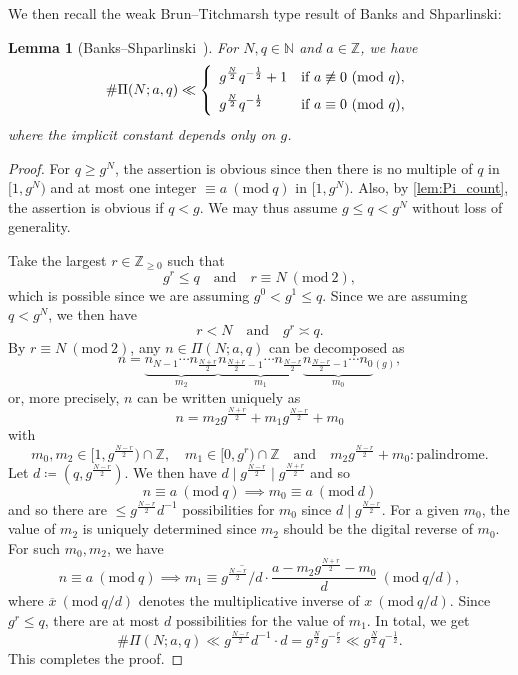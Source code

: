 \documentclass{amsart}
\theoremstyle{plain}
\newtheorem{lemma}[theorem]{Lemma}
\theoremstyle{definition}
\renewcommand{\mod}[1]{(\mathrm{mod}\ #1)}
\renewcommand{\and}{\quad\text{and}\quad}
\begin{document}
We then recall the weak Brun--Titchmarsh type result of Banks and Shparlinski:
\begin{lemma}[Banks--Shparlinski~\cite{BanksShparlinski:PrimeDivisorPalindrome}]
\label{lem:BS_Brun_Titchmarsh}
For $N,q\in\mathbb{N}$ and $a\in\mathbb{Z}$, we have
\[
\#\Pi(N;a,q)
\ll
\left\{
\begin{array}{>{\displaystyle}ll}
g^{\frac{N}{2}}q^{-\frac{1}{2}}+1&\text{if $a\not\equiv0\ \mod{q}$},\\[2mm]
g^{\frac{N}{2}}q^{-\frac{1}{2}}&\text{if $a\equiv0\ \mod{q}$},
\end{array}
\right.
\]
where the implicit constant depends only on $g$.
\end{lemma}
\begin{proof}
For $q\ge g^{N}$, the assertion is obvious since then
there is no multiple of $q$ in $[1,g^{N})$
and at most one integer $\equiv a\ \mod{q}$ in $[1,g^{N})$.
Also, by \cref{lem:Pi_count},
the assertion is obvious if $q<g$.
We may thus assume $g\le q<g^{N}$ without loss of generality.

Take the largest $r\in\mathbb{Z}_{\ge0}$ such that
\[
g^{r}\le q
\and
r\equiv N\ \mod{2},
\]
which is possible since we are assuming $g^{0}<g^{1}\le q$.
Since we are assuming $q<g^{N}$, we then have
\[
r<N
\and
g^{r}\asymp q.
\]
By $r\equiv N\ \mod{2}$,
any $n\in\Pi(N;a,q)$ can be decomposed as
\[
n=
{\underbrace{n_{N-1}\cdots n_{\frac{N+r}{2}}}_{m_{2}}
\underbrace{n_{\frac{N+r}{2}-1}\cdots n_{\frac{N-r}{2}}}_{m_{1}}
\underbrace{n_{\frac{N-r}{2}-1}\cdots n_{0}}_{m_{0}}}{}_{(g)},
\]
or, more precisely, $n$ can be written uniquely as
\[
n
=
m_{2}g^{\frac{N+r}{2}}
+m_{1}g^{\frac{N-r}{2}}
+m_{0}
\]
with
\[
m_{0},m_{2}\in[1,g^{\frac{N-r}{2}})\cap\mathbb{Z},\quad
m_{1}\in[0,g^{r})\cap\mathbb{Z}
\and
m_{2}g^{\frac{N-r}{2}}+m_{0}:\text{palindrome}.
\]
Let $d\coloneqq(q,g^{\frac{N-r}{2}})$. We then have $d\mid g^{\frac{N-r}{2}}\mid g^{\frac{N+r}{2}}$ and so
\[
n\equiv a\ \mod{q}
\implies
m_{0}\equiv a\ \mod{d}
\]
and so there are $\le g^{\frac{N-r}{2}}d^{-1}$ possibilities for $m_{0}$
since $d\mid g^{\frac{N-r}{2}}$.
For a given $m_{0}$,
the value of $m_{2}$ is uniquely determined
since $m_{2}$ should be the digital reverse of $m_{0}$.
For such $m_{0},m_{2}$, we have
\[
n\equiv a\ \mod{q}
\implies
m_{1}
\equiv
\overline{g^{\frac{N-r}{2}}/d}\cdot\frac{a-m_{2}g^{\frac{N+r}{2}}-m_{0}}{d}\ \mod{q/d},
\]
where $\overline{x}\ \mod{q/d}$ denotes the multiplicative inverse of $x\ \mod{q/d}$.
Since $g^{r}\le q$, there are at most $d$ possibilities for the value of $m_{1}$.
In total, we get
\[
\#\Pi(N;a,q)
\ll
g^{\frac{N-r}{2}}d^{-1}\cdot d
=
g^{\frac{N}{2}}g^{-\frac{r}{2}}
\ll
g^{\frac{N}{2}}q^{-\frac{1}{2}}.
\]
This completes the proof.
\end{proof}
\end{document}
